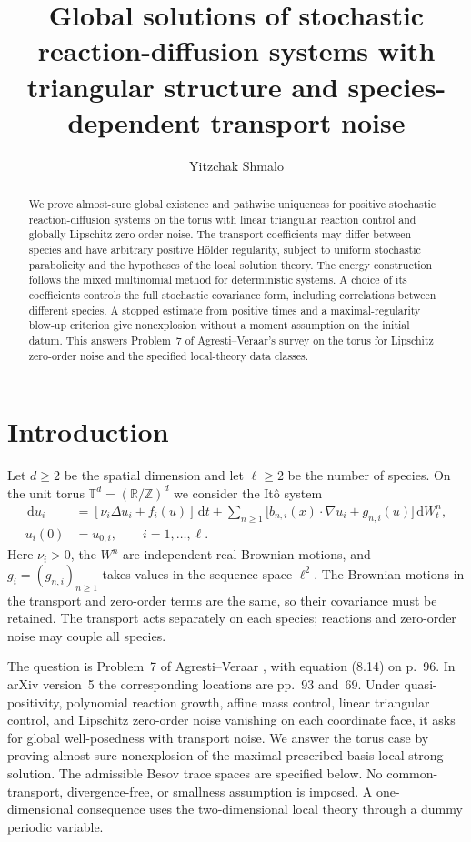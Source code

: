 \documentclass[11pt]{amsart}
\title[Triangular systems with transport noise]{Global solutions of stochastic reaction-diffusion systems with triangular structure and species-dependent transport noise}
\author{Yitzchak Shmalo}
\date{}
\theoremstyle{definition}
\newcommand{\T}{\mathbb T}
\newcommand{\R}{\mathbb R}
\newcommand{\dd}{\,\mathrm d}
\newcommand{\ellTwo}{\ell^2}
\numberwithin{equation}{section}
\begin{document}
\begin{abstract}
We prove almost-sure global existence and pathwise uniqueness for positive
stochastic reaction-diffusion systems on the torus with linear triangular
reaction control and globally Lipschitz zero-order noise. The transport
coefficients may differ between species and have arbitrary positive H\"older
regularity, subject to uniform stochastic parabolicity and the hypotheses
of the local solution theory. The energy construction follows the mixed
multinomial method for deterministic systems. A choice of its coefficients
controls the full stochastic covariance form, including correlations between
different species. A stopped estimate from positive times and a
maximal-regularity blow-up criterion give nonexplosion without a moment
assumption on the initial datum. This answers Problem~7 of
Agresti--Veraar's survey on the torus for Lipschitz zero-order noise and
the specified local-theory data classes.
\end{abstract}
\maketitle

\section{Introduction}

Let $d\geq2$ be the spatial dimension and let $\ell\geq2$ be the number
of species. On the unit torus $\T^d=(\R/\mathbb Z)^d$ we consider the
It\^o system
\begin{equation}\label{eq:system}
\begin{split}
\dd u_i&=[\nu_i\Delta u_i+f_i(u)]\dd t
 +\sum_{n\geq1}\bigl[b_{n,i}(x)\cdot\nabla u_i+g_{n,i}(u)\bigr]\dd W^n_t,
 \\ u_i(0)&=u_{0,i},\qquad i=1,\ldots,\ell.
\end{split}
\end{equation}
Here $\nu_i>0$, the $W^n$ are independent real Brownian motions, and
$g_i=(g_{n,i})_{n\geq1}$ takes values in the sequence space $\ellTwo$. The Brownian motions
in the transport and zero-order terms are the same, so their covariance
must be retained. The transport acts separately on each species; reactions
and zero-order noise may couple all species.

The question is Problem~7 of Agresti--Veraar
\cite[p.~131]{AVsurvey}, with equation (8.14) on p.~96. In arXiv
version~5 the corresponding locations are pp.~93 and~69. Under
quasi-positivity, polynomial reaction growth, affine mass control, linear
triangular control, and Lipschitz zero-order noise vanishing on each
coordinate face, it asks for global well-posedness with transport noise.
We answer the torus case by proving almost-sure nonexplosion of the
maximal prescribed-basis local strong solution. The admissible Besov trace
spaces are specified below. No common-transport, divergence-free, or
smallness assumption is imposed. A one-dimensional consequence uses the
two-dimensional local theory through a dummy periodic variable.
\end{document}
